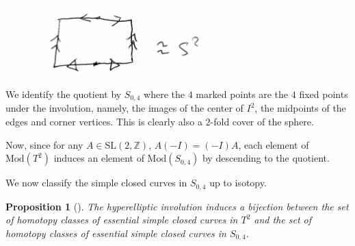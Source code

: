 \documentclass[reqno]{amsart}
\newtheorem{proposition}[theorem]{Proposition}
\theoremstyle{definition}
\theoremstyle{remark}
\newcommand{\SL}{{\mathrm{SL}}}
\newcommand{\Mod}{{\mathrm{Mod}}}
\begin{document}
\begin{figure}[htpb]
    \centering
    \includegraphics[width=0.6\textwidth]{involution-on-torus-quotient.jpg}
    \caption{}
    \label{fig:involution-on-torus-quotient}
\end{figure}

We identify the quotient
by $S_{0,4}$ where the $4$ marked points are
the $4$ fixed points under the involution, namely, the images
of the
center of $I^2$, the midpoints of the edges and corner vertices.
This is clearly also a $2$-fold cover of the sphere.

Now, since for any $A \in \SL (2,\mathbb{Z})$,
$A (-I) = (-I) A$,
each element of $\Mod \left( T^2 \right) $ induces
an element of $\Mod \left( S_{0,4} \right) $ by
descending to the quotient.

We now classify the simple closed curves in
$S_{0,4}$ up to isotopy.

\begin{proposition}[]
    The hyperelliptic involution induces a bijection
    between the set of homotopy classes of essential
    simple closed curves in $T^2$ and the
    set of homotopy classes of essential simple closed 
    curves in $S_{0,4}$.
\end{proposition}
\end{document}
